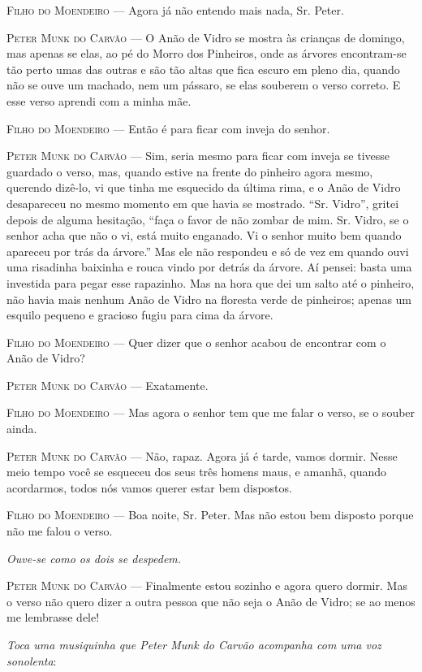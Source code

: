\begin{myparindent}{0pt}
\begin{Parskip}
\textsc{Filho do Moendeiro} --- Agora já não entendo mais nada, Sr. Peter.

\textsc{Peter Munk do Carvão} --- O Anão de Vidro se mostra às crianças de
domingo, mas apenas se elas, ao pé do Morro dos Pinheiros, onde as
árvores encontram-se tão perto umas das outras e são tão altas que fica
escuro em pleno dia, quando não se ouve um machado, nem um pássaro, se
elas souberem o verso correto. E esse verso aprendi com a minha mãe.

\textsc{Filho do Moendeiro} --- Então é para ficar com inveja do senhor.

\textsc{Peter Munk do Carvão} --- Sim, seria mesmo para ficar com inveja se
tivesse guardado o verso, mas, quando estive na frente do pinheiro agora
mesmo, querendo dizê-lo, vi que tinha me esquecido da última rima, e o
Anão de Vidro desapareceu no mesmo momento em que havia se mostrado.
``Sr. Vidro'', gritei depois de alguma hesitação, ``faça o favor de não
zombar de mim. Sr. Vidro, se o senhor acha que não o vi, está muito
enganado. Vi o senhor muito bem quando apareceu por trás da árvore.''
Mas ele não respondeu e só de vez em quando ouvi uma risadinha baixinha
e rouca vindo por detrás da árvore. Aí pensei: basta uma investida para
pegar esse rapazinho. Mas na hora que dei um salto até o pinheiro, não
havia mais nenhum Anão de Vidro na floresta verde de pinheiros; apenas
um esquilo pequeno e gracioso fugiu para cima da árvore.

\textsc{Filho do Moendeiro} --- Quer dizer que o senhor acabou de encontrar com o
Anão de Vidro?

\textsc{Peter Munk do Carvão} --- Exatamente.

\textsc{Filho do Moendeiro} --- Mas agora o senhor tem que me falar o verso, se o
souber ainda.

\textsc{Peter Munk do Carvão} --- Não, rapaz. Agora já é tarde, vamos dormir.
Nesse meio tempo você se esqueceu dos seus três homens maus, e amanhã,
quando acordarmos, todos nós vamos querer estar bem dispostos.

\textsc{Filho do Moendeiro} --- Boa noite, Sr. Peter. Mas não estou bem disposto
porque não me falou o verso.

\emph{Ouve-se como os dois se despedem.}

\textsc{Peter Munk do Carvão} --- Finalmente estou sozinho e agora quero dormir.
Mas o verso não quero dizer a outra pessoa que não seja o Anão de Vidro;
se ao menos me lembrasse dele!

\emph{Toca uma musiquinha que Peter Munk do Carvão acompanha com uma voz
sonolenta}:


\end{Parskip}
\end{myparindent}

